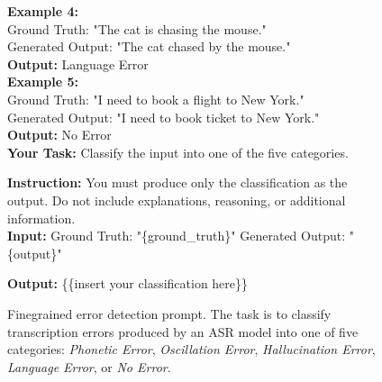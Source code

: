 \begin{figure*}[h]
\begin{tcolorbox}
    \textbf{Example 4:} \\
    Ground Truth: "The cat is chasing the mouse." \\
    Generated Output: "The cat chased by the mouse." \\
    \textbf{Output:} Language Error \\
    
    \textbf{Example 5:} \\
    Ground Truth: "I need to book a flight to New York." \\
    Generated Output: "I need to book ticket to New York." \\
    \textbf{Output:} No Error \\

    \textbf{Your Task:}
    Classify the input into one of the five categories.

    \textbf{Instruction:}  
    You must produce only the classification as the output. Do not include explanations, reasoning, or additional information. \\

    \textbf{Input:}  
    Ground Truth: "\{ground\_truth\}"  
    Generated Output: "\{output\}"  

    \textbf{Output:} \{\{insert your classification here\}\}
    \end{tcolorbox}
    \caption{Finegrained error detection prompt. The task is to classify transcription errors produced by an ASR model into one of five categories: \textit{Phonetic Error}, \textit{Oscillation Error}, \textit{Hallucination Error}, \textit{Language Error}, or \textit{No Error}.}
    \label{fig:finegrained_prompt}
\end{figure*}

